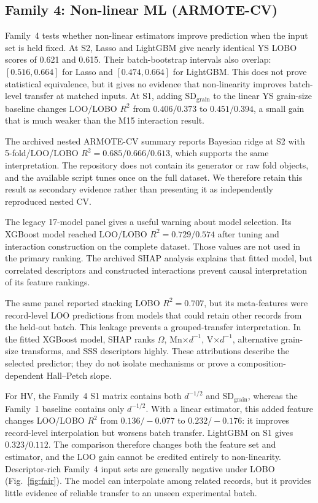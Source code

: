\documentclass[5p,times,twocolumn]{elsarticle}
\newcommand{\familyfour}{Non-linear ML (ARMOTE-CV)}
\begin{document}
\subsection{Family 4: \familyfour}

Family~4 tests whether non-linear estimators improve prediction when the input set is held fixed. At S2, Lasso and LightGBM give nearly identical YS LOBO scores of 0.621 and 0.615. Their batch-bootstrap intervals also overlap: $[0.516,0.664]$ for Lasso and $[0.474,0.664]$ for LightGBM. This does not prove statistical equivalence, but it gives no evidence that non-linearity improves batch-level transfer at matched inputs. At S1, adding $\mathrm{SD}_{\mathrm{grain}}$ to the linear YS grain-size baseline changes LOO/LOBO $R^2$ from $0.406/0.373$ to $0.451/0.394$, a small gain that is much weaker than the M15 interaction result.

The archived nested ARMOTE-CV summary reports Bayesian ridge at S2 with 5-fold/LOO/LOBO $R^2=0.685/0.666/0.613$, which supports the same interpretation. The repository does not contain its generator or raw fold objects, and the available script tunes once on the full dataset. We therefore retain this result as secondary evidence rather than presenting it as independently reproduced nested CV.

The legacy 17-model panel gives a useful warning about model selection. Its XGBoost model reached LOO/LOBO $R^2=0.729/0.574$ after tuning and interaction construction on the complete dataset. Those values are not used in the primary ranking. The archived SHAP analysis explains that fitted model, but correlated descriptors and constructed interactions prevent causal interpretation of its feature rankings.

The same panel reported stacking LOBO $R^2=0.707$, but its meta-features were record-level LOO predictions from models that could retain other records from the held-out batch. This leakage prevents a grouped-transfer interpretation. In the fitted XGBoost model, SHAP ranks $\Omega$, Mn$\times d^{-1}$, V$\times d^{-1}$, alternative grain-size transforms, and SSS descriptors highly. These attributions describe the selected predictor; they do not isolate mechanisms or prove a composition-dependent Hall--Petch slope.

For HV, the Family~4 S1 matrix contains both $d^{-1/2}$ and $\mathrm{SD}_{\mathrm{grain}}$, whereas the Family~1 baseline contains only $d^{-1/2}$. With a linear estimator, this added feature changes LOO/LOBO $R^2$ from $0.136/-0.077$ to $0.232/-0.176$: it improves record-level interpolation but worsens batch transfer. LightGBM on S1 gives $0.323/0.112$. The comparison therefore changes both the feature set and estimator, and the LOO gain cannot be credited entirely to non-linearity. Descriptor-rich Family~4 input sets are generally negative under LOBO (Fig.~\ref{fig:fair}). The model can interpolate among related records, but it provides little evidence of reliable transfer to an unseen experimental batch.
\end{document}
